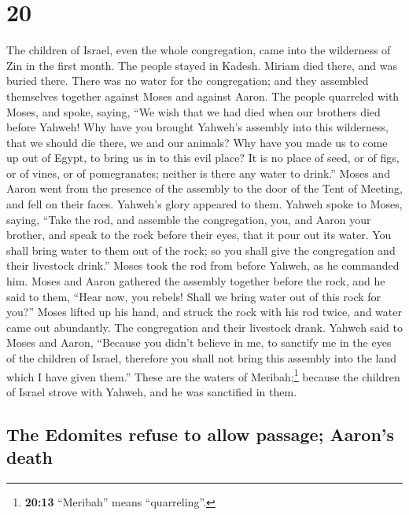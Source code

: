 \hypertarget{section-19}{%
\section{20}\label{section-19}}

 The children of Israel, even the whole congregation, came
into the wilderness of Zin in the first month. The people stayed in
Kadesh. Miriam died there, and was buried there.  There
was no water for the congregation; and they assembled themselves
together against Moses and against Aaron.  The people
quarreled with Moses, and spoke, saying, ``We wish that we had died when
our brothers died before Yahweh!  Why have you brought
Yahweh's assembly into this wilderness, that we should die there, we and
our animals?  Why have you made us to come up out of
Egypt, to bring us in to this evil place? It is no place of seed, or of
figs, or of vines, or of pomegranates; neither is there any water to
drink.''  Moses and Aaron went from the presence of the
assembly to the door of the Tent of Meeting, and fell on their faces.
Yahweh's glory appeared to them.  Yahweh spoke to Moses,
saying,  ``Take the rod, and assemble the congregation,
you, and Aaron your brother, and speak to the rock before their eyes,
that it pour out its water. You shall bring water to them out of the
rock; so you shall give the congregation and their livestock drink.''
 Moses took the rod from before Yahweh, as he commanded
him.  Moses and Aaron gathered the assembly together
before the rock, and he said to them, ``Hear now, you rebels! Shall we
bring water out of this rock for you?''  Moses lifted up
his hand, and struck the rock with his rod twice, and water came out
abundantly. The congregation and their livestock drank. 
Yahweh said to Moses and Aaron, ``Because you didn't believe in me, to
sanctify me in the eyes of the children of Israel, therefore you shall
not bring this assembly into the land which I have given them.''
 These are the waters of Meribah;\footnote{\textbf{20:13}
  ``Meribah'' means ``quarreling''.} because the children of Israel
strove with Yahweh, and he was sanctified in them.

\hypertarget{the-edomites-refuse-to-allow-passage-aarons-death}{%
\subsection{The Edomites refuse to allow passage; Aaron's
death}\label{the-edomites-refuse-to-allow-passage-aarons-death}}

